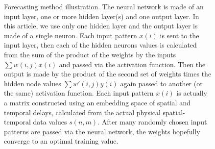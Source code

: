 \documentclass[journal]{IEEEtran}
\begin{document}
\begin{figure}
\caption{Forecasting method illustration. The neural network is made of an input layer, one or more hidden layer(s) and one output layer.
In this article, we use only one hidden layer and the output layer is made of a single neuron. Each input pattern  $x(i)$ is sent to the
input layer, then each of the hidden neurons values is calculated from the sum of the product of the weights by the inputs $\sum w(i,j) x(i)$
and passed via the activation function. Then the output is made by the product of the second set of
weights times the hidden node values $\sum w'(i,j) y(i)$ again passed to another (or the same) activation function.
Each input pattern  $x(i)$ is actually a matrix constructed using an embedding space of
spatial and temporal delays, calculated from the actual physical spatial-temporal data values $s(n,m)$. After many randomly chosen input patterns
are passed via the neural network, the weights hopefully converge to an optimal training value.}
\label{architecture}
\end{figure}
\end{document}
